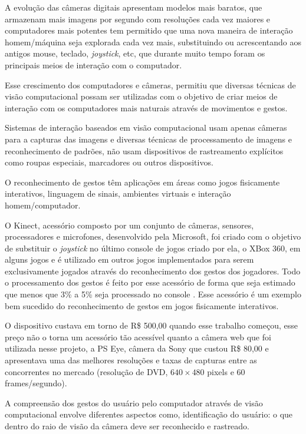 
A evolução das câmeras digitais apresentam modelos mais baratos, que armazenam mais imagens por segundo com resoluções cada vez maiores e computadores mais potentes tem permitido que uma nova maneira de interação homem/máquina seja explorada cada vez mais, substituindo ou acrescentando aos antigos mouse, teclado, \textit{joystick}, etc, que durante muito tempo foram os principais meios de interação com o computador.

Esse crescimento dos computadores e câmeras, permitiu que diversas técnicas de visão computacional possam ser utilizadas com o objetivo de criar meios de interação com os computadores mais naturais através de movimentos e gestos.

Sistemas de interação baseados em visão computacional usam apenas câmeras para a capturas das imagens e diversas técnicas de processamento de imagens e reconhecimento de padrões, não usam dispositivos de rastreamento explícitos como roupas especiais, marcadores ou outros dispositivos.

O reconhecimento de gestos têm aplicações em áreas como jogos fisicamente interativos, linguagem de sinais, ambientes virtuais e interação homem/computador.

O Kinect, acessório composto por um conjunto de câmeras, sensores, processadores e microfones, desenvolvido pela Microsoft, foi criado com o objetivo de substituir o \textit{joystick} no último console de jogos criado por ela, o XBox 360, em alguns jogos e é utilizado em outros jogos implementados para serem exclusivamente jogados através do reconhecimento dos gestos dos jogadores. Todo o processamento dos gestos é feito por esse acessório de forma que seja estimado que menos que 3\% a 5\% seja processado no console \cite{InsideKinect}. Esse acessório é um exemplo bem sucedido do reconhecimento de gestos em jogos fisicamente interativos.

O dispositivo custava em torno de R\$ 500,00 quando esse trabalho começou, esse preço não o torna um acessório tão acessível quanto a câmera web que foi utilizada nesse projeto, a PS Eye, câmera da Sony que custou R\$ 80,00 e apresentava uma das melhores resoluções e taxas de capturas entre as concorrentes no mercado (resolução de DVD, $640\times480$ pixels e 60 frames/segundo).

A compreensão dos gestos do usuário pelo computador através de visão computacional envolve diferentes aspectos como, identificação do usuário: o que dentro do raio de visão da câmera deve ser reconhecido e rastreado.

